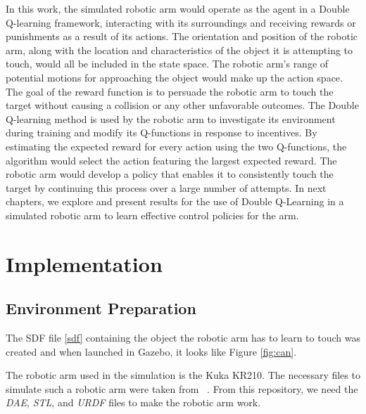 \documentclass[12pt,oneside]{article}
\begin{document}
In this work, the simulated robotic arm would operate as the agent in a Double Q-learning framework, interacting with its surroundings and receiving rewards or punishments as a result of its actions. The orientation and position of the robotic arm, along with the location and characteristics of the object it is attempting to touch, would all be included in the state space. The robotic arm's range of potential motions for approaching the object would make up the action space. The goal of the reward function is to persuade the robotic arm to touch the target without causing a collision or any other unfavorable outcomes.
The Double Q-learning method is used by the robotic arm to investigate its environment during training and modify its Q-functions in response to incentives. By estimating the expected reward for every action using the two Q-functions, the algorithm would select the action featuring the largest expected reward. The robotic arm would develop a policy that enables it to consistently touch the target by continuing this process over a large number of attempts. In next chapters, we explore and present results for the use of Double Q-Learning in a simulated robotic arm to learn effective control policies for the arm.

%
\section{Implementation}\label{sec:umsetzung}
\subsection{Environment Preparation}\label{sec:env-preparation}
The SDF file \ref{sdf} containing the object the robotic arm has to learn to touch was created and when launched in Gazebo, it looks like Figure \ref{fig:can}.

The robotic arm used in the simulation is the Kuka KR210. The necessary files to simulate such a robotic arm were taken from ~\cite{RoboND-Kinematics-Project}. From this repository, we need the \textit{DAE}, \textit{STL}, and \textit{URDF} files to make the robotic arm work.
\end{document}
